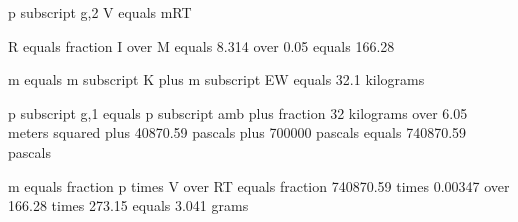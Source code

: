 p subscript g,2 V equals mRT

R equals fraction I over M equals 8.314 over 0.05 equals 166.28

m equals m subscript K plus m subscript EW equals 32.1 kilograms

p subscript g,1 equals p subscript amb plus fraction 32 kilograms over 6.05 meters squared plus 40870.59 pascals plus 700000 pascals equals 740870.59 pascals

m equals fraction p times V over RT equals fraction 740870.59 times 0.00347 over 166.28 times 273.15 equals 3.041 grams